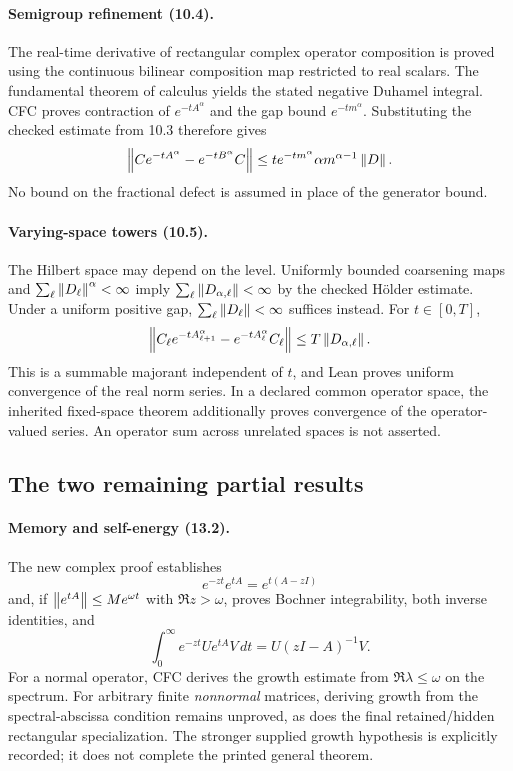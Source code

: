 \paragraph{Semigroup refinement (10.4).}
The real-time derivative of rectangular complex operator composition is proved
using the continuous bilinear composition map restricted to real scalars.
The fundamental theorem of calculus yields the stated negative Duhamel integral.
CFC proves contraction of $e^{-tA^\alpha}$ and the gap bound $e^{-tm^\alpha}$.
Substituting the checked estimate from 10.3 therefore gives
\[
\left\lVert Ce^{-tA^\alpha}-e^{-tB^\alpha}C\right\rVert
\le t e^{-tm^\alpha}\alpha m^{\alpha-1}\left\lVert D\right\rVert.
\]
No bound on the fractional defect is assumed in place of the generator bound.

\paragraph{Varying-space towers (10.5).}
The Hilbert space may depend on the level. Uniformly bounded coarsening maps and
$\sum_\ell\left\lVert D_\ell\right\rVert^{\alpha}<\infty$ imply
$\sum_\ell\left\lVert D_{\alpha,\ell}\right\rVert<\infty$ by the checked H\"older estimate.
Under a uniform positive gap, $\sum_\ell\left\lVert D_\ell\right\rVert<\infty$ suffices instead.
For $t\in[0,T]$,
\[
\left\lVert C_\ell e^{-tA_{\ell+1}^\alpha}-e^{-tA_\ell^\alpha}C_\ell\right\rVert
\le T\left\lVert D_{\alpha,\ell}\right\rVert.
\]
This is a summable majorant independent of $t$, and Lean proves uniform convergence
of the real norm series. In a declared common operator space, the inherited
fixed-space theorem additionally proves convergence of the operator-valued series.
An operator sum across unrelated spaces is not asserted.

\clearpage
\subsection*{The two remaining partial results}
\paragraph{Memory and self-energy (13.2).}
The new complex proof establishes
\[
e^{-zt}e^{tA}=e^{t(A-zI)}
\]
and, if $\left\lVert e^{tA}\right\rVert\le M e^{\omega t}$ with $\Re z>\omega$, proves Bochner
integrability, both inverse identities, and
\[
\int_0^\infty e^{-zt}Ue^{tA}V\,dt=U(zI-A)^{-1}V.
\]
For a normal operator, CFC derives the growth estimate from
$\Re\lambda\le\omega$ on the spectrum. For arbitrary finite \emph{nonnormal}
matrices, deriving growth from the spectral-abscissa condition remains unproved,
as does the final retained/hidden rectangular specialization. The stronger supplied
growth hypothesis is explicitly recorded; it does not complete the printed general theorem.

